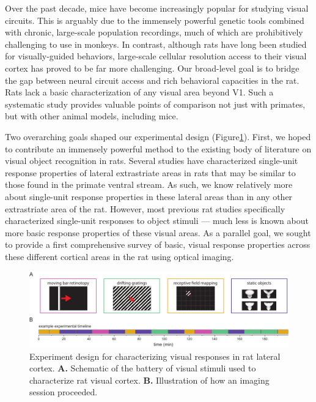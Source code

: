 Over the past decade, mice have become increasingly popular for studying visual circuits. This is arguably due to the immensely powerful genetic tools combined with chronic, large-scale population recordings, much of which are prohibitively challenging to use in monkeys. In contrast, although rats have long been studied for visually-guided behaviors, large-scale cellular resolution access to their visual cortex has proved to be far more challenging. Our broad-level goal is to bridge the gap between neural circuit access and rich behavioral capacities in the rat. Rats lack a basic characterization of any visual area beyond V1. Such a systematic study provides valuable points of comparison not just with primates, but with other animal models, including mice. 

Two overarching goals shaped our experimental design (Figure\ref{fig:experiment_design}). First, we hoped to contribute an immensely powerful method to the existing body of literature on visual object recognition in rats. Several studies have characterized single-unit response properties of lateral extrastriate areas in rats that may be similar to those found in the primate ventral stream\cite{Tafazoli2017, Vermaercke2014, VinkenX, Vermaerke2015}. As such, we know relatively more about single-unit response properties in these lateral areas than in any other extrastriate area of the rat. However, most previous rat studies specifically characterized single-unit responses to object stimuli --- much less is known about more basic response properties of these visual areas. As a parallel goal, we sought to provide a first comprehensive survey of basic, visual response properties across these different cortical areas in the rat using optical imaging. 

\begin{figure}
    \includegraphics[width=\textwidth]{figures/chapter_3/fig_3-1_experiment_design/fig_3-1_experiment_design.pdf}
    \vspace{.1in}
    \caption[Experiment design]{Experiment design for characterizing visual responses in rat lateral cortex. 
    \textbf{A.} Schematic of the battery of visual stimuli used to characterize rat visual cortex. 
    \textbf{B.} Illustration of how an imaging session proceeded.
    \label{fig:experiment_design}}
\end{figure}

